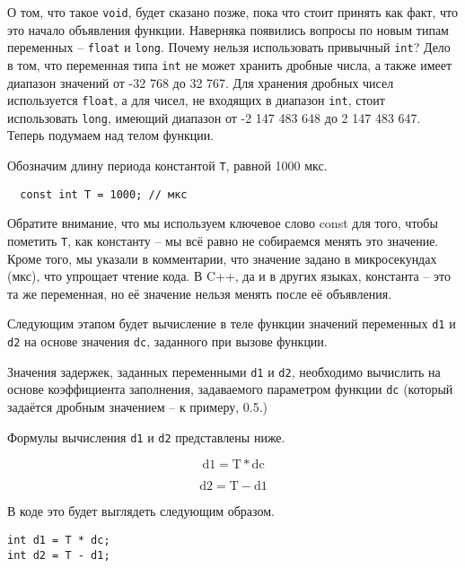 \documentclass[../sparc.tex]{subfiles}
\begin{document}
О том, что такое \texttt{void}, будет сказано позже, пока что стоит принять как
факт, что это начало объявления функции. Наверняка появились вопросы по новым
типам переменных -- \texttt{float} и \texttt{long}. Почему нельзя использовать
привычный \texttt{int}? Дело в том, что переменная типа \texttt{int} не может
хранить дробные числа, а также имеет диапазон значений от -32 768 до 32 767. Для
хранения дробных чисел используется \texttt{float}, а для чисел, не входящих в
диапазон \texttt{int}, стоит использовать \texttt{long}, имеющий диапазон от -2
147 483 648 до 2 147 483 647. Теперь подумаем над телом функции.

Обозначим длину периода константой \texttt{T}, равной 1000 мкс.

\begin{verbatim}
  const int T = 1000; // мкс
\end{verbatim}

Обратите внимание, что мы используем ключевое слово const для того, чтобы
пометить \texttt{T}, как константу -- мы всё равно не собираемся менять это
значение.  Кроме того, мы указали в комментарии, что значение задано в
микросекундах (мкс), что упрощает чтение кода.  В C++, да и в других языках,
константа -- это та же переменная, но её значение нельзя менять после её
объявления.

Следующим этапом будет вычисление в теле функции значений переменных \texttt{d1}
и \texttt{d2} на основе значения \texttt{dc}, заданного при вызове функции.

Значения задержек, заданных переменными \texttt{d1} и \texttt{d2}, необходимо
вычислить на основе коэффициента заполнения, задаваемого параметром функции
\texttt{dc} (который задаётся дробным значением -- к примеру, 0.5.)

Формулы вычисления \texttt{d1} и \texttt{d2} представлены ниже.

\begin{equation}
  \mbox{d1} = \mbox{T} * \mbox{dc}
  \label{Формула вычисления времени подачи сигнала ``HIGH''}
\end{equation}

\begin{equation}
  \mbox{d2} = \mbox{T} - \mbox{d1}
  \label{Формула вычисления времени подачи сигнала ``LOW''}
\end{equation}

В коде это будет выглядеть следующим образом.

\begin{verbatim}
int d1 = T * dc;
int d2 = T - d1;
\end{verbatim}
\end{document}
